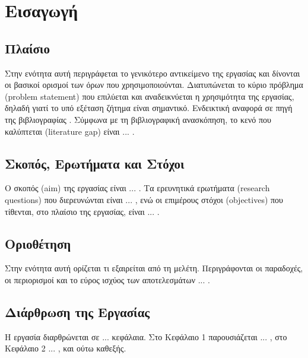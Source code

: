 \section{Εισαγωγή}

\subsection{Πλαίσιο}

Στην ενότητα αυτή περιγράφεται το γενικότερο αντικείμενο της εργασίας και
δίνονται οι βασικοί ορισμοί των όρων που χρησιμοποιούνται. Διατυπώνεται το
κύριο πρόβλημα (problem statement) που επιλύεται και αναδεικνύεται η
χρησιμότητα της εργασίας, δηλαδή γιατί το υπό εξέταση ζήτημα είναι
σημαντικό. Ενδεικτική αναφορά σε πηγή της βιβλιογραφίας
\cite{placeholder}. Σύμφωνα με τη βιβλιογραφική ανασκόπηση, το κενό που
καλύπτεται (literature gap) είναι ... .

\subsection{Σκοπός, Ερωτήματα και Στόχοι}

Ο σκοπός (aim) της εργασίας είναι ... . Τα ερευνητικά ερωτήματα (research
questions) που διερευνώνται είναι ... , ενώ οι επιμέρους στόχοι
(objectives) που τίθενται, στο πλαίσιο της εργασίας, είναι ... .

\subsection{Οριοθέτηση}

Στην ενότητα αυτή ορίζεται τι εξαιρείται από τη μελέτη. Περιγράφονται οι
παραδοχές, οι περιορισμοί και το εύρος ισχύος των αποτελεσμάτων ... .

\subsection{Διάρθρωση της Εργασίας}

Η εργασία διαρθρώνεται σε ... κεφάλαια. Στο Κεφάλαιο 1 παρουσιάζεται ... ,
στο Κεφάλαιο 2 ... , και ούτω καθεξής.
